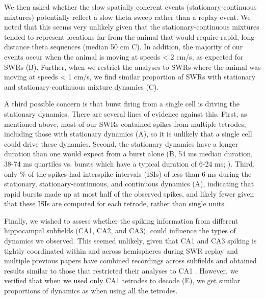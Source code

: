 \documentclass[9pt,lineno]{elife}
\begin{document}
We then asked whether the slow spatially coherent events (stationary-continuous mixtures) potentially reflect a slow theta sweep rather than a replay event. We noted that this seems very unlikely given that the stationary-continuous mixtures tended to represent locations far from the animal that would require rapid, long-distance theta sequences (median 50 cm C). In addition, the majority of our events occur when the animal is moving at speeds < 2 cm/s, as expected for SWRs (B). Further, when we restrict the analyses to SWRs where the animal was moving at speeds < 1 cm/s, we find similar proportion of SWRs with stationary and stationary-continuous mixture dynamics (C).

A third possible concern is that burst firing from a single cell is driving the stationary dynamics. There are several lines of evidence against this. First, as mentioned above, most of our SWRs contained spikes from multiple tetrodes, including those with stationary dynamics (A), so it is unlikely that a single cell could drive these dynamics. Second, the stationary dynamics have a longer duration than one would expect from a burst alone (B, 54 ms median duration, 38-74 ms quartiles vs. bursts which have a typical duration of 6-24 ms; \cite{RanckJrStudiessingleneurons1973, HarrisTemporalInteractionSingle2001, TroppSneiderDifferentialbehavioralstatedependence2006}). Third, only \% of the spikes had interspike intervals (ISIs) of less than 6 ms during the stationary, stationary-continuous, and continuous dynamics (A), indicating that rapid bursts made up at most half of the observed spikes, and likely fewer given that these ISIs are computed for each tetrode, rather than single units.

Finally, we wished to assess whether the spiking information from different hippocampal subfields (CA1, CA2, and CA3), could influence the types of dynamics we observed. This seemed unlikely, given that CA1 and CA3 spiking is tightly coordinated within and across hemispheres during SWR replay \citep{CarrTransientSlowGamma2012} and multiple previous papers have combined recordings across subfields and obtained results similar to those that restricted their analyses to CA1 \citep{DibaForwardreversehippocampal2007a, KarlssonAwakereplayremote2009}. However, we verified that when we used only CA1 tetrodes to decode (E), we get similar proportions of dynamics as when using all the tetrodes.
\end{document}

